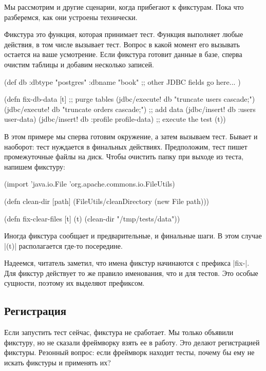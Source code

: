 Мы рассмотрим и другие сценарии, когда прибегают к фикстурам. Пока что
разберемся, как они устроены технически.

Фикстура это функция, которая принимает тест. Функция выполняет любые действия,
в том числе вызывает тест. Вопрос в какой момент его вызывать остается на ваше
усмотрение. Если фикстура готовит данные в базе, сперва очистим таблицы и
добавим несколько записей.

\begin{english}
  \begin{clojure}
(def db {:dbtype "postgres" :dbname "book"
         ;; other JDBC fields go here...
         })

(defn fix-db-data [t]
  ;; purge tables
  (jdbc/execute! db "truncate users cascade;")
  (jdbc/execute! db "truncate orders cascade;")
  ;; add data
  (jdbc/insert! db :users user-data)
  (jdbc/insert! db :profile profile-data)
  ;; execute the test
  (t))
  \end{clojure}
\end{english}

В этом примере мы сперва готовим окружение, а затем вызываем тест. Бывает и
наоборот: тест нуждается в финальных действиях. Предположим, тест пишет
промежуточные файлы на диск. Чтобы очистить папку при выходе из теста, напишем
фикстуру:

\begin{english}
  \begin{clojure}
(import 'java.io.File
        'org.apache.commons.io.FileUtils)

(defn clean-dir [path]
  (FileUtils/cleanDirectory (new File path)))

(defn fix-clear-files [t]
  (t)
  (clean-dir "/tmp/tests/data"))
  \end{clojure}
\end{english}

Иногда фикстура сообщает и предварительные, и финальные шаги. В этом случае
\spverb|(t)| располагается где-то посередине.

Надеемся, читатель заметил, что имена фикстур начинаются с префикса
\spverb|fix-|. Для фикстур действует то же правило именования, что и для
тестов. Это особые сущности, поэтому их выделяют префиксом.

\subsection{Регистрация}

Если запустить тест сейчас, фикстура не сработает. Мы только объявили фикстуру,
но не сказали фреймворку взять ее в работу. Это делают регистрацией фикстуры.
Резонный вопрос: если фреймворк находит тесты, почему бы ему не искать фикстуры
и применять их?

